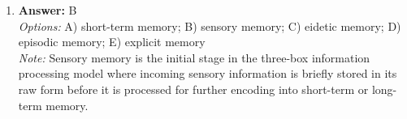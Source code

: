 \documentclass[12pt]{article}
\begin{document}
\begin{enumerate}[label=\arabic*.]
\\ \textit{Note:} Secondary prevention in community mental health focuses on reducing the impact of mental health issues by facilitating early intervention and increasing access to mental health services for those at risk or experiencing early symptoms.
\item \textbf{Answer:} B
\\ \textit{Options:} A) short-term memory; B) sensory memory; C) eidetic memory; D) episodic memory; E) explicit memory
\\ \textit{Note:} Sensory memory is the initial stage in the three-box information processing model where incoming sensory information is briefly stored in its raw form before it is processed for further encoding into short-term or long-term memory.
\end{enumerate}
\end{document}
